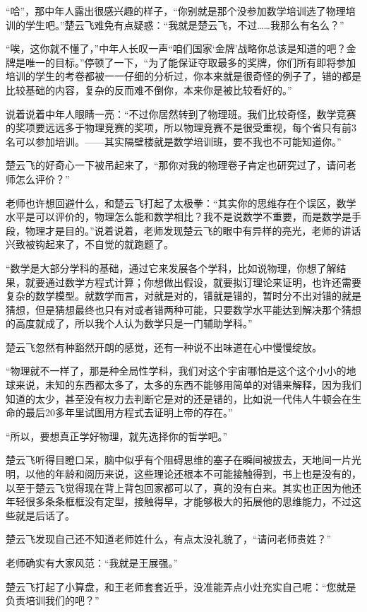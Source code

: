 “哈”，那中年人露出很感兴趣的样子，“你别就是那个没参加数学培训选了物理培训的学生吧。”楚云飞难免有点疑惑：“我就是楚云飞，不过……我那么有名么？”

“唉，这你就不懂了，”中年人长叹一声“咱们国家‘金牌’战略你总该是知道的吧？金牌是唯一的目标。”停顿了一下，“为了能保证夺取最多的奖牌，你们所有即将参加培训的学生的考卷都被一一仔细的分析过，你本来就是很奇怪的例子了，错的都是比较基础的内容，复杂的反而难不倒你，本来你是被比较看好的。”

说着说着中年人眼睛一亮：“不过你居然转到了物理班。我们比较奇怪，数学竞赛的奖项要远远多于物理竞赛的奖项，所以物理竞赛不是很受重视，每个省只有前3名可以参加培训。——其实隔壁楼就是数学培训班，要不我也不可能知道你。”

楚云飞的好奇心一下被吊起来了，“那你对我的物理卷子肯定也研究过了，请问老师怎么评价？”

老师也许想回避什么，和楚云飞打起了太极拳：“其实你的思维存在个误区，数学水平是可以评价的，物理怎么能和数学相比？我不是说数学不重要，而是数学是手段，物理才是目的。”说着说着，老师发现楚云飞的眼中有异样的亮光，老师的讲话兴致被钩起来了，不自觉的就跑题了。

“数学是大部分学科的基础，通过它来发展各个学科，比如说物理，你想了解结果，就要通过数学方程式计算；你想做出假设，就要拟订理论来证明，也许还需要复杂的数学模型。就数学而言，对就是对的，错就是错的，暂时分不出对错的就是猜想，但是猜想最终也只有对或者错两种可能，只要数学水平能达到解决那个猜想的高度就成了，所以我个人认为数学只是一门辅助学科。”

楚云飞忽然有种豁然开朗的感觉，还有一种说不出味道在心中慢慢绽放。

“物理就不一样了，那是种全局性学科，我们对这个宇宙哪怕是这个这个小小的地球来说，未知的东西都太多了，太多的东西不能够用简单的对错来解释，因为我们知道的太少，甚至没有权力去判断它是对的还是错的，比如说一代伟人牛顿会在生命的最后20多年里试图用方程式去证明上帝的存在。”

“所以，要想真正学好物理，就先选择你的哲学吧。”

楚云飞听得目瞪口呆，脑中似乎有个阻碍思维的塞子在瞬间被拔去，天地间一片光明，以他的年龄和阅历来说，这些理论还根本不可能接触得到，书上也是没有的，以至于楚云飞觉得现在背上背包回家都可以了，真的没有白来。其实也正因为他还年轻很多条条框框没有定型，接触得早，才能够极大的拓展他的思维能力，不过这些就是后话了。

楚云飞发现自己还不知道老师姓什么，有点太没礼貌了，“请问老师贵姓？”

老师确实有大家风范：“我就是王展强。”

楚云飞打起了小算盘，和王老师套套近乎，没准能弄点小灶充实自己呢：“您就是负责培训我们的吧？”

